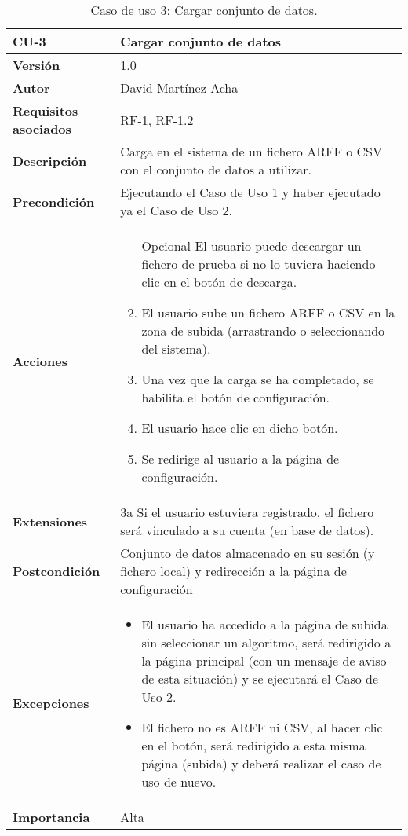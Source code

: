 \begin{table}[p]
	\centering
	\begin{tabularx}{\linewidth}{ p{} p{} }
		\toprule
		\textbf{CU-3}    & \textbf{Cargar conjunto de datos}\\
		\toprule
		\textbf{Versión}              & 1.0    \\
		\textbf{Autor}                & David Martínez Acha \\
		\textbf{Requisitos asociados} & RF-1, RF-1.2 \\
		\textbf{Descripción}          & Carga en el sistema de un fichero ARFF o CSV con el conjunto de datos a utilizar. \\
		\textbf{Precondición}         & Ejecutando el Caso de Uso 1 y haber ejecutado ya el Caso de Uso 2.\\
		\textbf{Acciones}             &
		\begin{enumerate}
			\def\labelenumi{\arabic{enumi}.}
			\tightlist
			\item [Opcional] El usuario puede descargar un fichero de prueba si no lo tuviera haciendo clic en el botón de descarga.
			\item El usuario sube un fichero ARFF o CSV en la zona de subida (arrastrando o seleccionando del sistema).
			\item Una vez que la carga se ha completado, se habilita el botón de configuración.
			\item El usuario hace clic en dicho botón.
			\item Se redirige al usuario a la página de configuración.
		\end{enumerate}\\
		\textbf{Extensiones}          & 3a Si el usuario estuviera registrado, el fichero será vinculado a su cuenta (en base de datos). \\
		\textbf{Postcondición}        & Conjunto de datos almacenado en su sesión (y fichero local) y redirección a la página de configuración \\
		\textbf{Excepciones}          & \begin{itemize}
			\item El usuario ha accedido a la página de subida sin seleccionar un algoritmo, será redirigido a la página principal (con un mensaje de aviso de esta situación) y se ejecutará el Caso de Uso 2.
			\item El fichero no es ARFF ni CSV, al hacer clic en el botón, será redirigido a esta misma página (subida) y deberá realizar el caso de uso de nuevo.
		\end{itemize} \\
		\textbf{Importancia}          & Alta \\
		\bottomrule
	\end{tabularx}
	\caption{Caso de uso 3: Cargar conjunto de datos.}
\end{table}

